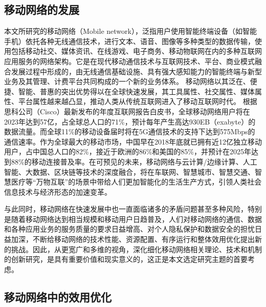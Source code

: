 \subsection{移动网络的发展}

本文所研究的移动网络（Mobile network），泛指用户使用智能终端设备（如智能手机）依托各种无线通信技术，进行文本、语音、图像等多种类型的数据传输，使用包括移动社交、媒体资讯、在线游戏、电子商务、移动物联网在内的多种互联网应用服务的网络架构。它是在现代移动通信技术与互联网技术、平台、商业模式融合发展过程中形成的，由无线通信基础设施、具有强大感知能力的智能终端与新型业务及其管理、计费平台共同构成的一个新的业务体系。
移动网络以其泛在、便捷、智能、普惠的突出优势得以在全球快速发展，其工具属性、社交属性、媒体属性、平台属性越来越凸显，推动人类从传统互联网进入了移动互联网时代。
根据思科公司（Cisco）最新发布的年度互联网报告白皮书\cite{Cisco2023}，全球移动网络用户将在2023年达到57亿，占全球总人口的71\%，预计每年产生高达930EB（exabyte）的数据流量。而全球11\%的移动设备届时将在5G通信技术的支持下达到575Mbps的通信速率。作为全球最大的移动市场，中国早在2018年底就已拥有近12亿独立移动用户，占中国总人口的82\%，接近于欧洲的86\%和美国的85\%，并预计在2025年达到88\%的移动连接普及率\cite{GSMA}。在可预见的未来，移动网络与云计算/边缘计算、人工智能、大数据、区块链等技术的深度融合，将在车联网、智慧城市、智慧交通、智慧医疗等“万物互联”的场景中带给人们更加智能化的生活生产方式，引领人类社会信息技术与经济形态的加速变革。

与此同时，移动网络在快速发展中也一直面临诸多的矛盾问题甚至多种风险，特别是随着移动网络达到相当规模和移动用户日趋普及，人们对移动网络的通信、数据和各种应用业务的服务质量的要求日益增高、对个人隐私保护和数据安全的担忧日益加深，不断给移动网络的技术性能、资源配置、有序运行和整体效用优化提出新的挑战。因此，从更宽广和多维的视角，深化细化移动网络相关理论、技术和机制的创新研究，是具有重要价值和现实意义的，这正是本文选定研究主题的首要考虑。


\subsection{移动网络中的效用优化}

